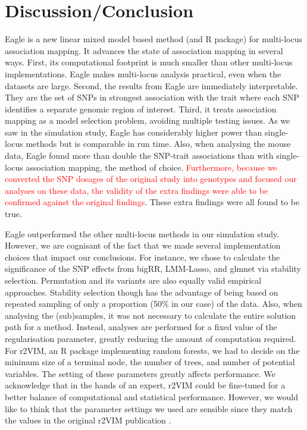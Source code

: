 \documentclass{article}
\begin{document}
\section{Discussion/Conclusion}
Eagle is a new linear mixed model based method (and R package) for multi-locus association mapping. It advances the state of association mapping in several ways. 
First, its computational footprint is much smaller than other multi-locus implementations. Eagle makes multi-locus analysis 
practical, even when the datasets are large. Second, the results from
 Eagle are immediately interpretable. They are the set of SNPs in strongest association with the trait where 
each SNP identifies a separate genomic region of interest. Third, it treats association mapping as a model selection problem, avoiding 
 multiple testing issues. 
 As we saw in the simulation study, Eagle has considerably higher power than single-locus methods but is comparable in run time.
Also, when analysing the mouse data, Eagle found more than double the SNP-trait associations than 
with single-locus association mapping, the method of choice. \textcolor{red}{Furthermore, because we converted the SNP dosages of the 
original study into genotypes and focused our analyses on these data, the validity of the extra findings were able to  be confirmed 
against the original findings}. These extra findings were all found to be true. 

Eagle outperformed the other multi-locus methods in our simulation study. However, we are cognisant of the fact  that we made several implementation 
choices that impact our conclusions.  For instance, we chose to calculate the significance of the 
SNP effects from bigRR, LMM-Lasso, and glmnet via stability selection.  Permutation and its variants \citep{ browning2008presto,pahl2010permory} are also equally valid empirical approaches. Stability selection though has the advantage of being based on repeated sampling of only a proportion (50\% in our case) of the 
data. Also, when analysing the (sub)samples, it was not necessary to calculate the entire solution path for a method. 
 Instead,  analyses are 
performed for a fixed value of the regularisation parameter, greatly reducing the amount of computation required. For r2VIM, an R package 
implementing random forests, we had to decide on the  minimum size of a terminal node, the number of trees, and number of potential variables. 
The setting of these parameters greatly affects performance.  We  acknowledge that in the hands of an expert, 
r2VIM could be fine-tuned for a better balance of computational and statistical performance. 
However, we would like to think that the parameter settings we used are sensible 
since they match the values in the original r2VIM publication \citep{szymczak2016r2vim}.
\end{document}
